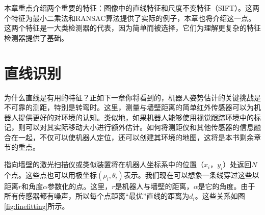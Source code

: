 本章重点介绍两个重要的特征：图像中的直线特征和尺度不变特征（SIFT）。这两个特征为最小二乘法和RANSAC算法提供了实际的例子，本章也将介绍这一点。这两个特征是一大类检测器的代表，因为简单而被选择，它们为理解更复杂的特征检测器提供了基础。


\section{直线识别}


为什么直线是有用的特征？正如下一章你将看到的，机器人姿势估计的关键挑战是不可靠的测距，特别是转弯时。这里，测量与墙壁距离的简单红外传感器可以为机器人提供更好的对环境的认知。类似地，如果机器人能够使用视觉跟踪环境中的标记，则可以对其实际移动大小进行额外估计。如何将测距仪和其他传感器的信息融合在一起，不仅可以使机器人定位，还可以创建其环境的地图，这将是本书剩余章节的重点。


指向墙壁的激光扫描仪或类似装置将在机器人坐标系中的位置$（x_i，y_i）$处返回$N$个点。这些点也可以用极坐标$(\rho_i,\theta_i)$表示。我们现在可以想象一条线穿过这些以距离$r$和角度$\alpha$参数化的点。这里，$r$是机器人与墙壁的距离，$\alpha$是它的角度。由于所有传感器都有噪声，所以每个点距离“最优”直线的距离为$d_i$。这些关系如图\ref{fig:linefitting}所示。

